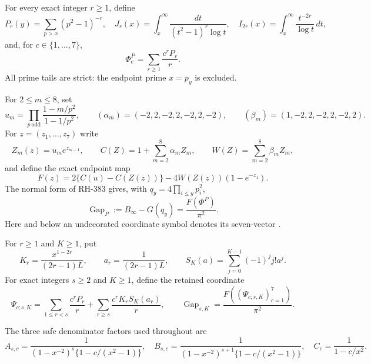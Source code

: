 \documentclass[11pt]{article}
\theoremstyle{definition}
\theoremstyle{remark}
\newcommand{\PhiP}{\Phi^{P}}
\newcommand{\GapP}{\operatorname{Gap}_{P}}
\newcommand{\GapSK}{\operatorname{Gap}_{s,K}}
\newcommand{\Binfty}{B_{\infty}}
\begin{document}
For every exact integer $r\ge1$, define
\begin{equation}
 P_r(y)=\sum_{p>x}(p^2-1)^{-r},\quad
 J_r(x)=\int_x^\infty\frac{dt}{(t^2-1)^r\log t},\quad
 I_{2r}(x)=\int_x^\infty\frac{t^{-2r}}{\log t}\,dt,
 \label{eq:tails}
\end{equation}
and, for $c\in\{1,\ldots,7\}$,
\begin{equation}
 \PhiP_c=\sum_{r\ge1}\frac{c^rP_r}{r}.
 \label{eq:PhiP}
\end{equation}
All prime tails are strict: the endpoint prime $x=p_y$ is excluded.

For $2\le m\le8$, set
\begin{equation}
 u_m=\prod_{p\ \mathrm{odd}}
 \frac{1-m/p^2}{1-1/p^2},\qquad
 (\alpha_m)=(-2,2,-2,2,-2,2,-2),\qquad
 (\beta_m)=(1,-2,2,-2,2,-2,2).
 \label{eq:u-alpha-beta}
\end{equation}
For $z=(z_1,\ldots,z_7)$ write
\[
 Z_m(z)=u_me^{z_{m-1}},\qquad
 C(Z)=1+\sum_{m=2}^8\alpha_mZ_m,\qquad
 W(Z)=\sum_{m=2}^8\beta_mZ_m,
\]
and define the exact endpoint map
\begin{equation}
 F(z)=2\{C(u)-C(Z(z))\}
 -4W(Z(z))(1-e^{-z_1}).
 \label{eq:F}
\end{equation}
The normal form of RH-383 gives, with
$q_y=4\prod_{i\le y}p_i^2$,
\begin{equation}
 \GapP:=\Binfty-G(q_y)=\frac{F(\PhiP)}{\pi^2}.
 \label{eq:actual-gap}
\end{equation}
Here and below an undecorated coordinate symbol denotes its seven-vector
\cite{RH383}.

For $r\ge1$ and $K\ge1$, put
\begin{equation}
 K_r=\frac{x^{1-2r}}{(2r-1)L},\qquad
 a_r=\frac1{(2r-1)L},\qquad
 S_K(a)=\sum_{j=0}^{K-1}(-1)^j j!a^j.
 \label{eq:factorial-defs}
\end{equation}
For exact integers $s\ge2$ and $K\ge1$, define the retained coordinate
\begin{equation}
 \Psi_{c;s,K}
 =\sum_{1\le r<s}\frac{c^rP_r}{r}
 +\sum_{r\ge s}\frac{c^rK_rS_K(a_r)}r,\qquad
 \GapSK=\frac{F((\Psi_{c;s,K})_{c=1}^7)}{\pi^2}.
 \label{eq:Psi-gap}
\end{equation}

The three safe denominator factors used throughout are
\begin{equation}
 A_{s,c}=\frac1{(1-x^{-2})^s\{1-c/(x^2-1)\}},\quad
 B_{s,c}=\frac1{(1-x^{-2})^{s+1}\{1-c/(x^2-1)\}},\quad
 C_c=\frac1{1-c/x^2}.
 \label{eq:ABC}
\end{equation}
\end{document}
